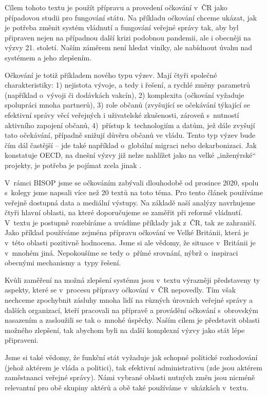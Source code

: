 Cílem tohoto textu je použít přípravu a provedení očkování v~ČR jako případovou studii pro fungování státu. Na příkladu očkování chceme ukázat, jak je potřeba změnit systém vládnutí a fungování veřejné správy tak, aby byl připraven nejen na případnou další krizi podobnou pandemii, ale i obecněji na výzvy 21. století. Naším záměrem není hledat viníky, ale nabídnout úvahu nad systémem a jeho zlepšením.


Očkování je totiž příkladem nového typu výzev. Mají čtyři společné charakteristiky: 1) nejistota vývoje, a tedy i řešení, a rychlé změny parametrů (například o~vývoji či dodávkách vakcín), 2) komplexita (očkování vyžaduje spolupráci mnoha partnerů), 3) role občanů (zvyšující se očekávání týkající se efektivní správy věcí veřejných i uživatelské zkušenosti, zároveň s~nutností aktivního zapojení občanů, 4)~přístup k~technologiím a datům, jež dále zvyšují tato očekávání, případně snižují důvěru občanů ve vládu. Tento typ výzev bude čím dál častější -- jde také například o~globální migraci nebo dekarbonizaci. Jak konstatuje OECD, na dnešní výzvy již nelze nahlížet jako na velké „inženýrské“ projekty, je potřeba je pojímat zcela jinak \cite{oecd_public_governance_reviews_skills_2020}.


V~rámci BISOP jsme se očkováním zabývali dlouhodobě od prosince 2020, spolu s~kolegy jsme napsali více než 20 textů na toto téma. Pro tento článek používáme veřejně dostupná data a mediální výstupy. Na základě naší analýzy navrhujeme čtyři hlavní oblasti, na které doporučujeme se zaměřit při reformě vládnutí. V~textu je postupně rozebíráme a uvádíme příklady jak z~ČR, tak ze zahraničí. Jako příklad používáme zejména přípravu očkování ve Velké Británii, která je v~této oblasti pozitivně hodnocena. Jsme si ale vědomy, že situace v~Británii je v~mnohém jiná. Nepokoušíme se tedy o~přímé srovnání, nýbrž o~inspiraci obecnými mechanismy a~typy řešení.


Kvůli zaměření na možná zlepšení systému jsou v~textu výrazněji představeny ty aspekty, které se v~procesu přípravy očkování v~ČR nepovedly. Tím však nechceme zpochybnit zásluhy mnoha lidí na různých úrovních veřejné správy a dalších organizací, kteří pracovali na přípravě a provádění očkování s~obrovským nasazením a zasloužili se tak o~mnohé úspěchy. Naším cílem je představit oblasti možného zlepšení, tak abychom byli na další komplexní výzvy jako stát lépe připraveni.

Jsme si také vědomy, že funkční stát vyžaduje jak schopné politické rozhodování (jehož aktérem je vláda a politici), tak efektivní administrativu (zde jsou aktérem zaměstnanci veřejné správy). Námi vybrané oblasti nutných změn jsou nicméně relevantní pro obě skupiny aktérů a obě také používáme v~ukázkách v~textu. 

